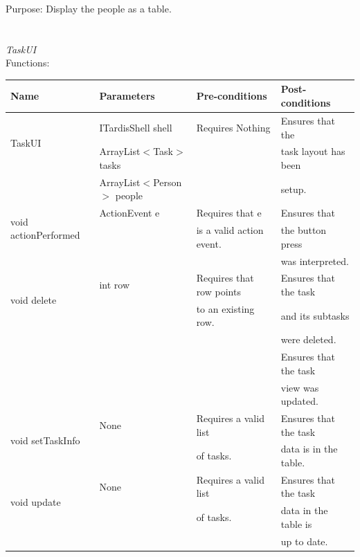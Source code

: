 Purpose: Display the people as a table.\\
\\
\\
\emph{TaskUI}\\
Functions:\\
\begin{tabular}{| l | l | l | l |}
\hline
Name & Parameters & Pre-conditions & Post-conditions\\
\hline
\multirow{2}{*}{TaskUI}{} & ITardisShell shell & Requires Nothing & Ensures that the\\ 
			        & ArrayList$<$Task$>$ tasks & & task layout has been\\ 
                                            & ArrayList$<$Person$>$ people & & setup.
\\
\hline
\multirow{2}{*}{void actionPerformed} & ActionEvent e & Requires that e            & Ensures that\\
                                                                &                        & is a valid action event. & the button press\\
                                                                &                        &                                      & was interpreted.
\\
\hline
\multirow{2}{*}{void delete} & int row         & Requires that row points & Ensures that the task \\
		 	           &                     & to an existing row.          & and its subtasks\\
		 	           &                     &                                         & were deleted.\\
 			           &                     &                                         & Ensures that the task\\
                                               &                     &                                         & view was updated.
\\
\hline
\multirow{2}{*}{void setTaskInfo} & None & Requires a valid list & Ensures that the task \\
		 		        &          & of tasks.                   & data is in the table. 
\\
\hline
\multirow{2}{*}{void update} & None & Requires a valid list & Ensures that the task\\
		 	             &          & of tasks.                  & data in the table is\\
			             &          &                                 & up to date.

\end{tabular}
